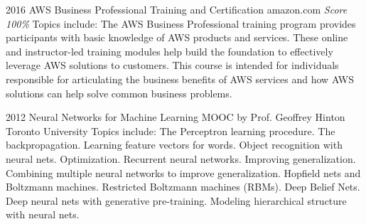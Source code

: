 \documentclass[11pt,a4paper]{moderncv}
\begin{document}
\cventry
    {2016}
    {AWS Business Professional}
    {Training and Certification}
    {amazon.com}
    {\textit{Score 100\%}}
    {
        Topics include:                                                          %
            The AWS Business Professional training program provides              %
                participants with basic knowledge of AWS products                %
                and services.                                                    %
            These online and instructor-led training modules help                %
                build the foundation to effectively leverage AWS                 %
                solutions to customers.                                          %
            This course is intended for individuals responsible for              %
                articulating the business benefits of AWS services               %
                and how AWS solutions can help solve common business             %
                problems.                                                        %
    }

\cventry
    {2012}
    {Neural Networks for Machine Learning}
    {MOOC by Prof. Geoffrey Hinton}
    {Toronto University}
    {}
    {
        Topics include:                                                          %
            The Perceptron learning procedure.                                   %
            The backpropagation.                                                 %
            Learning feature vectors for words.                                  %
            Object recognition with neural nets.                                 %
            Optimization.                                                        %
            Recurrent neural networks.                                           %
            Improving generalization.                                            %
            Combining multiple neural networks to improve generalization.        %
            Hopfield nets and Boltzmann machines.                                %
            Restricted Boltzmann machines (RBMs).                                %
            Deep Belief Nets.                                                    %
            Deep neural nets with generative pre-training.                       %
            Modeling hierarchical structure with neural nets.                    %
    }
\end{document}
